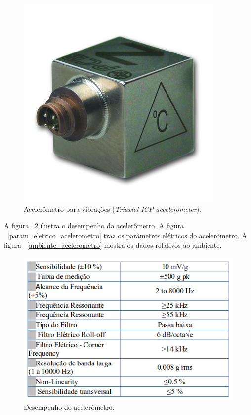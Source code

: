   \begin{figure}[!htbp]
    \centering
    \includegraphics[scale=0.5]{editaveis/figuras/acelerometro}
    \caption[Acelerômetro para vibrações (\textit{Triaxial ICP accelerometer})]
    {Acelerômetro para vibrações (\textit{Triaxial ICP accelerometer}).}
    \label{acelerometro}
  \end{figure}
  
  A figura ~\ref{desempenho_acelerometro} ilustra o desempenho do acelerômetro. A figura ~\ref{param_eletrico_acelerometro} traz
   os parâmetros elétricos do acelerômetro. A figura ~\ref{ambiente_acelerometro} mostra os dados relativos ao ambiente.
  
  \begin{figure}[!htbp]
    \centering
    \includegraphics[scale=0.5]{editaveis/figuras/desempenho_acelerometro}
    \caption[Desempenho do acelerômetro]
    {Desempenho do acelerômetro.}
    \label{desempenho_acelerometro}
  \end{figure}
   
